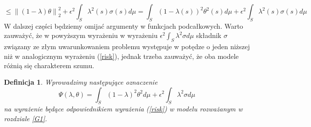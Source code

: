 \documentclass{mwart}
\newtheorem{df}{Definicja}
\newcommand{\norm}[1]{\left\lVert#1\right\rVert}
\begin{document}
\begin{displaymath}
\leq \norm{(1-\lambda)\theta}_2^2+\epsilon^2\int_S\lambda^2(s)\sigma(s)d\mu=\int_S(1-\lambda(s))^2\theta^2(s)d\mu+\epsilon^2\int_S\lambda^2(s)\sigma(s)d\mu
\end{displaymath}
W dalszej części będziemy omijać argumenty w funkcjach podcałkowych. Warto zauważyć, że w powyższym wyrażeniu w wyrażeniu $\epsilon^2\int_S\lambda^2\sigma d\mu$ składnik $\sigma$ związany ze złym uwarunkowaniem problemu występuje w potędze o jeden niższej niż w analogicznym wyrażeniu (\ref{risk}), jednak trzeba zauważyć, że oba modele różnią się charakterem szumu.
\begin{df}
Wprowadzimy następujące oznaczenie 
\begin{displaymath}
\Psi(\lambda,\theta)=\int_S(1-\lambda)^2\theta^2d\mu+\epsilon^2\int_S\lambda^2\sigma d\mu
\end{displaymath}
na wyrażenie będące odpowiednikiem wyrażenia (\ref{risk}) w modelu rozważanym w rozdziale \ref{G1}.
\end{df}
\end{document}

